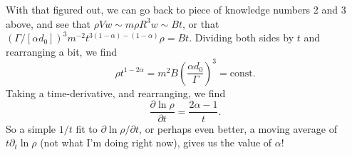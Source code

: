 \documentclass[onecolumn, amsmath, amsfonts, amssymb]{aastex62}
\begin{document}
With that figured out, we can go back to piece of knowledge numbers 2 and 3 above, and see
that $\rho V w \sim m \rho R^3 w \sim B t$, or that $(\Gamma/[\alpha d_0])^3 m^{-2} t^{3(1-\alpha) - (1-\alpha)}\rho = Bt$.
Dividing both sides by $t$ and rearranging a bit, we find
$$
\rho t^{1 - 2\alpha} = m^2 B \left(\frac{\alpha d_0}{\Gamma}\right)^3 = \text{const.}
$$
Taking a time-derivative, and rearranging, we find
\begin{equation}
\frac{\partial \ln \rho}{\partial t} = \frac{2\alpha - 1}{t}.
\end{equation}
So a simple $1 / t$ fit to $\partial \ln\rho / \partial t$, or perhaps even better, a moving
average of $t \partial_t \ln\rho$ (not what I'm doing right now), gives us the value of $\alpha$! 






\end{document}
